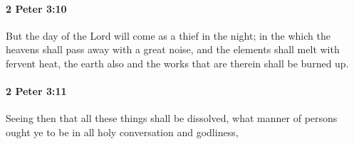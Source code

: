 		\paragraph{2 Peter 3:10} %
			\label{2PETER-3-10}

			But the day of the Lord will come as a thief in the night; in the which the heavens shall pass away with a great noise, and the elements shall melt with fervent heat, the earth also and the works that are therein shall be burned up.

			\begin{framed}
			\scriptsize
				\begin{compactdesc}
					\item[SBLG] 
				\end{compactdesc}
			\end{framed}

		\paragraph{2 Peter 3:11} %
			\label{2PETER-3-11}

			Seeing then that all these things shall be dissolved, what manner of persons ought ye to be in all holy conversation and godliness,

